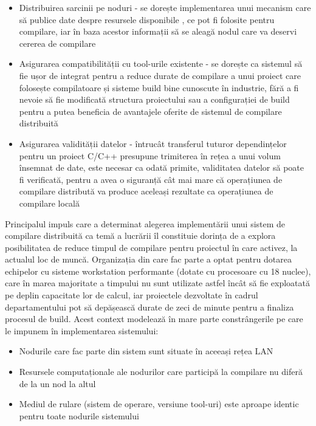 \begin{itemize}
    comunicare și așa mai departe
    \item Distribuirea sarcinii pe noduri - se dorește implementarea unui mecanism care să publice date despre resursele disponibile 
    , ce pot fi folosite pentru compilare, iar în baza acestor informații să se aleagă nodul care va deservi cererea de compilare
    \item Asigurarea compatibilității cu tool-urile existente - se dorește ca sistemul să fie ușor de integrat pentru a reduce durate de compilare
    a unui proiect care folosește compilatoare și sisteme build bine cunoscute în industrie, fără a fi nevoie să fie modificată structura proiectului
    sau a configurației de build pentru a putea beneficia de avantajele oferite de sistemul de compilare distribuită
    \item Asigurarea validității datelor - întrucât transferul tuturor dependințelor pentru un proiect C/C++ presupune trimiterea în
    rețea a unui volum însemnat de date, este necesar ca odată primite, validitatea datelor să poate fi verificată, pentru a avea o siguranță
    cât mai mare că operațiunea de compilare distribută va produce aceleași rezultate ca operațiunea de compilare locală
\end{itemize}

Principalul impuls care a determinat alegerea implementării unui sistem de compilare distribuită ca temă a lucrării îl constituie dorința
de a explora posibilitatea de reduce timpul de compilare pentru proiectul în care activez, la actualul loc de muncă. Organizația din care fac parte
a optat pentru dotarea echipelor cu sisteme workstation performante (dotate cu procesoare cu 18 nuclee), care în marea majoritate a timpului
nu sunt utilizate astfel încât să fie exploatată pe deplin capacitate lor de calcul, iar proiectele dezvoltate în cadrul departamentului
pot să depășească durate de zeci de minute pentru a finaliza procesul de build. Acest context modelează în mare parte constrângerile
pe care le impunem în implementarea sistemului:

\begin{itemize}
    \item Nodurile care fac parte din sistem sunt situate în aceeași rețea LAN
    \item Resursele computaționale ale nodurilor care participă la compilare nu diferă de la un nod la altul
    \item Mediul de rulare (sistem de operare, versiune tool-uri) este aproape identic pentru toate nodurile sistemului
\end{itemize}

